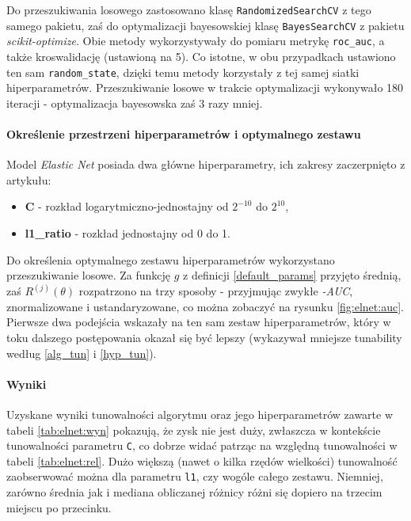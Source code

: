 \documentclass[a4paper,11pt]{article}
\begin{document}
Do przeszukiwania losowego zastosowano klasę \texttt{RandomizedSearchCV} z tego samego pakietu, zaś do optymalizacji bayesowskiej klasę \texttt{BayesSearchCV} z pakietu \textit{scikit-optimize}. Obie metody wykorzystywały do pomiaru metrykę \texttt{roc\_auc}, a także kroswalidację (ustawioną na 5). Co istotne, w obu przypadkach ustawiono ten sam \texttt{random\_state}, dzięki temu metody korzystały z tej samej siatki hiperparametrów. Przeszukiwanie losowe w trakcie optymalizacji wykonywało 180 iteracji - optymalizacja bayesowska zaś 3 razy mniej.

\paragraph{Określenie przestrzeni hiperparametrów i optymalnego zestawu \vspace{2ex} \\}

Model \textit{Elastic Net} posiada dwa główne hiperparametry, ich zakresy zaczerpnięto z artykułu\cite{tuna}:
\begin{itemize}
    \item \textbf{C} - rozkład logarytmiczno-jednostajny od $2^{-10}$ do $2^{10}$,
    \item \textbf{l1\_ratio} - rozkład jednostajny od 0 do 1.
\end{itemize}

Do określenia optymalnego zestawu hiperparametrów wykorzystano przeszukiwanie losowe. Za funkcję $g$ z definicji \eqref{default_params} przyjęto średnią, zaś $R^{(j)}(\theta)$ rozpatrzono na trzy sposoby - przyjmując zwykłe \textit{-AUC}, znormalizowane i ustandaryzowane, co można zobaczyć na rysunku \ref{fig:elnet:auc}. Pierwsze dwa podejścia wskazały na ten sam zestaw hiperparametrów, który w toku dalszego postępowania okazał się być lepszy (wykazywał mniejsze tunability według \eqref{alg_tun} i \eqref{hyp_tun}).

\paragraph{Wyniki \vspace{2ex} \\}
 Uzyskane wyniki tunowalności algorytmu oraz jego hiperparametrów zawarte w tabeli \ref{tab:elnet:wyn} pokazują, że zysk nie jest duży, zwłaszcza w kontekście tunowalności parametru \texttt{C}, co dobrze widać patrząc na względną tunowalności w tabeli \ref{tab:elnet:rel}. Dużo większą (nawet o kilka rzędów wielkości) tunowalność zaobserwować można dla parametru \texttt{l1}, czy wogóle całego zestawu. Niemniej, zarówno średnia jak i mediana obliczanej różnicy różni się dopiero na trzecim miejscu po przecinku.
\end{document}
